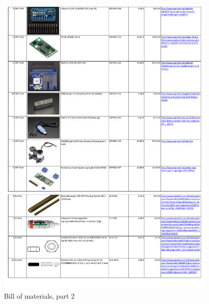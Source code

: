 \begin{figure}[H]
    \centering
    \includegraphics[width=0.97\textwidth,trim=0 31 0 8,clip=true]{fig/ch-rpi-hardware/2_Masterquad2015_BoM}
    \caption{Bill of materials, part 2}
    \label{fig:hardware:BillOfMat:2}
\end{figure}

